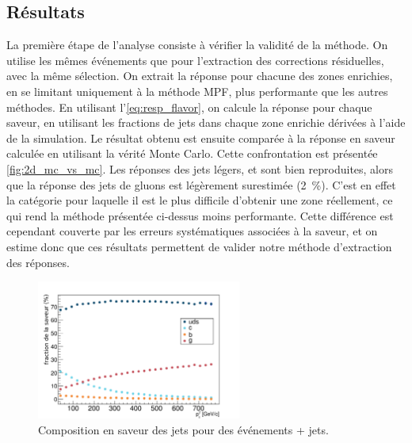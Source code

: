 \subsection{Résultats}

La première étape de l'analyse consiste à vérifier la validité de la méthode. On utilise les mêmes événements que pour l'extraction des corrections résiduelles, avec la même sélection. On extrait la réponse pour chacune des zones enrichies, en se limitant uniquement à la méthode MPF, plus performante que les autres méthodes. En utilisant l'\cref{eq:resp_flavor}, on calcule la réponse pour chaque saveur, en utilisant les fractions de jets dans chaque zone enrichie dérivées à l'aide de la simulation. Le résultat obtenu est ensuite comparée à la réponse en saveur calculée en utilisant la vérité Monte Carlo. Cette confrontation est présentée \cref{fig:2d_mc_vs_mc}. Les réponses des jets légers, \Pcharm et \Pbottom sont bien reproduites, alors que la réponse des jets de gluons est légèrement surestimée (\tilde \SI{2}{\%}). C'est en effet la catégorie pour laquelle il est le plus difficile d'obtenir une zone réellement, ce qui rend la méthode présentée ci-dessus moins performante. Cette différence est cependant couverte par les erreurs systématiques associées à la saveur, et on estime donc que ces résultats permettent de valider notre méthode d'extraction des réponses.

\begin{figure}[htbp]
  \centering
  \includegraphics[width=0.60\textwidth]{chapitre4/figs/flavor/gammajet_flavors.pdf}
  \caption{Composition en saveur des jets pour des événements \Pphoton + jets.}
  \label{fig:gjet_flavor}
\end{figure}

